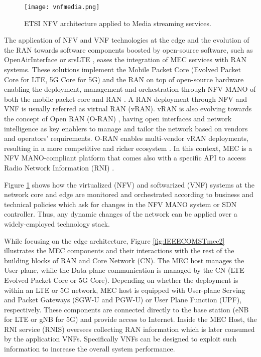 \begin{figure}[htp]
	\centering
	\texttt{[image: vnfmedia.png]}
	\caption{ETSI NFV architecture applied to Media streaming services.}
	\label{fig:IEEECOMSTvnf4media}
	\vspace{-0.5cm}
\end{figure}

The application of NFV and VNF technologies at the edge and the evolution of the RAN towards software components boosted by open-source software, such as OpenAirInterface \cite{nikaein_openairinterface_2014} or srsLTE \cite{Gomez2016}, eases the integration of MEC services with RAN systems. These solutions implement the Mobile Packet Core (Evolved Packet Core for LTE, 5G Core for 5G) and the RAN on top of open-source hardware enabling the deployment, management and orchestration through NFV MANO of both the mobile packet core \cite{Nguyen2017, Ocampo2020} and RAN \cite{Gabilondo2020}.
A RAN deployment through NFV and VNF is usually referred as virtual RAN (vRAN). vRAN is also evolving towards the concept of Open RAN (O-RAN) \cite{openRAN}, having open interfaces and network intelligence as key enablers to manage and tailor the network based on vendors and operators' requirements. O-RAN enables multi-vendor vRAN deployments, resulting in a more competitive and richer ecosystem \cite{gavrilovska2020cloud}.
In this context, MEC is a NFV MANO-compliant platform that comes also with a specific API to access Radio Network Information (RNI) \cite{etsigsmec012}.

Figure \ref{fig:IEEECOMSTvnf4media} shows how the virtualized (NFV) and softwarized (VNF) systems at the network core and edge are monitored and orchestrated according to business and technical policies which ask for changes in the NFV MANO system or SDN controller. Thus, any dynamic changes of the network can be applied over a widely-employed technology stack. 

While focusing on the edge architecture, Figure \ref{fig:IEEECOMSTmec2} illustrates the MEC components and their interactions with the rest of the building blocks of RAN and Core Network (CN). The MEC host manages the User-plane, while the Data-plane communication is managed by the CN (LTE Evolved Packet Core or 5G Core).
Depending on whether the deployment is within an LTE or 5G network, MEC host is equipped with User-plane Serving and Packet Gateways (SGW-U and PGW-U) or User Plane Function (UPF), respectively. These components are connected directly to the base station (eNB for LTE or gNB for 5G) and provide access to Internet. Inside the MEC Host, the RNI service (RNIS) oversees collecting RAN information which is later consumed by the application VNFs. Specifically VNFs can be designed to exploit such information to increase the overall system performance.

